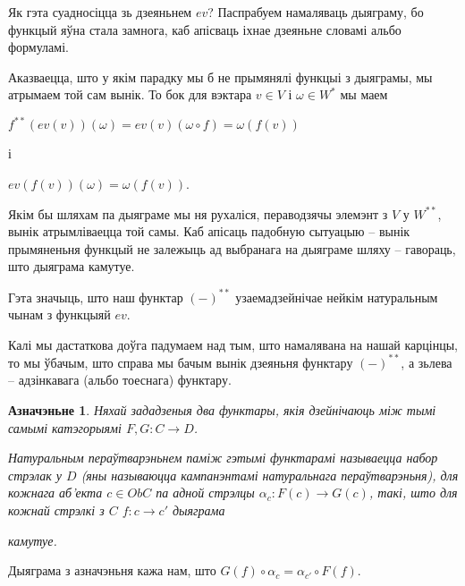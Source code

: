 \documentclass[a4paper,12pt]{book}
\newtheorem{definition}{Азначэньне}[section]
\begin{document}
Як гэта суадносіцца зь дзеяньнем $ev$? Паспрабуем намаляваць дыяграму,
бо функцый яўна стала замнога, каб апісваць іхнае дзеяньне словамі
альбо формуламі.


Аказваецца, што у якім парадку мы б не прымянялі функцыі з дыяграмы,
мы атрымаем той сам вынік. То бок для вэктара $v \in V$ і $\omega \in W^*$ мы маем

$f^{**}(ev(v))(\omega) = ev(v)(\omega \circ f) = \omega(f(v))$

і

$ev(f(v))(\omega) = \omega(f(v))$.

Якім бы шляхам па дыяграме мы ня рухаліся, пераводзячы элемэнт з $V$ у
$W^{**}$, вынік атрымліваецца той самы. Каб апісаць падобную сытуацыю
-- вынік прымяненьня функцый не залежыць ад выбранага на дыяграме
шляху -- гавораць, што дыяграма камутуе.

Гэта значыць, што наш функтар
$(-)^{**}$ узаемадзейнічае нейкім натуральным чынам з функцыяй $ev$.

Калі мы дастаткова доўга падумаем над тым, што намалявана на нашай
карцінцы, то мы ўбачым, што справа мы бачым вынік дзеяньня функтару
$(-)^{**}$, а зьлева -- адзінкавага (альбо тоеснага) функтару.

\begin{definition}
  Няхай зададзеныя два функтары, якія дзейнічаюць між тымі самымі
  катэгорыямі $F, G: C \rightarrow D$.

  Натуральным пераўтварэньнем
  паміж гэтымі функтарамі называецца набор стрэлак у $D$ (яны
  называюцца кампанэнтамі натуральнага пераўтварэньня), для
  кожнага аб'екта $c \in Ob C$ па адной стрэлцы $\alpha_c: F(c)
  \rightarrow G(c)$, такі, што для кожнай стрэлкі з $C$ $f:c
  \rightarrow c'$ дыяграма


  камутуе.

\end{definition}

Дыяграма з азначэньня кажа нам, што $G(f) \circ \alpha_c = \alpha_{c'}
\circ F(f)$.
\end{document}
